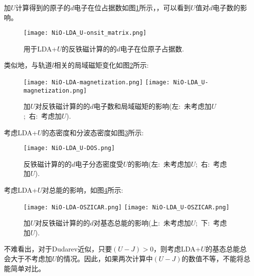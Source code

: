 加$U$计算得到的原子的$d$电子在位占据数如图\ref{NiO-LDA_U-onsite_matrix}所示，，可以看到$U$值对$d$电子数的影响。
\begin{figure}[h!]
\centering
\texttt{[image: NiO-LDA\_U-onsit\_matrix.png]}
\caption{\small \textrm{用于\textrm{LDA}+$U$的反铁磁计算的的$d$电子在位原子占据数.}}%
\label{NiO-LDA_U-onsite_matrix}
\end{figure}

类似地，与轨道$l$相关的局域磁矩变化如图\ref{NiO-LDA_U-magnetization}所示:
\begin{figure}[h!]
\centering
\texttt{[image: NiO-LDA-magnetization.png]}
\texttt{[image: NiO-LDA\_U-magnetization.png]}
\caption{\small \textrm{加$U$对反铁磁计算的的$d$电子数和局域磁矩的影响(左:~未考虑加$U$;~右:~考虑加$U$).}}%
\label{NiO-LDA_U-magnetization}
\end{figure}

考虑\textrm{LDA}+$U$的态密度和分波态密度如图\ref{NiO-LDA_U-DOS}所示:
\begin{figure}[h!]
\centering
\texttt{[image: NiO-LDA\_U-DOS.png]}
\caption{\small \textrm{反铁磁计算的的$d$电子分态密度受$U$的影响(左:~未考虑加$U$;~右:~考虑加$U$).}}%
\label{NiO-LDA_U-DOS}
\end{figure}

考虑\textrm{LDA}+$U$对总能的影响，如图\ref{NiO-LDA_U-tot}所示:~
\begin{figure}[h!]
\centering
\texttt{[image: NiO-LDA-OSZICAR.png]}
\texttt{[image: NiO-LDA\_U-OSZICAR.png]}
\caption{\small \textrm{加$U$对反铁磁计算的的$d$对基态总能的影响(上:~未考虑加$U$;~下:~考虑加$U$).}}%
\label{NiO-LDA_U-tot}
\end{figure}
不难看出，对于\textrm{Dudarev}近似，只要$(U-J)>0$，则考虑\textrm{LDA}+$U$的基态总能总会大于不考虑加$U$的情况。因此，如果两次计算中$(U-J)$的数值不等，不能将总能简单对比。
